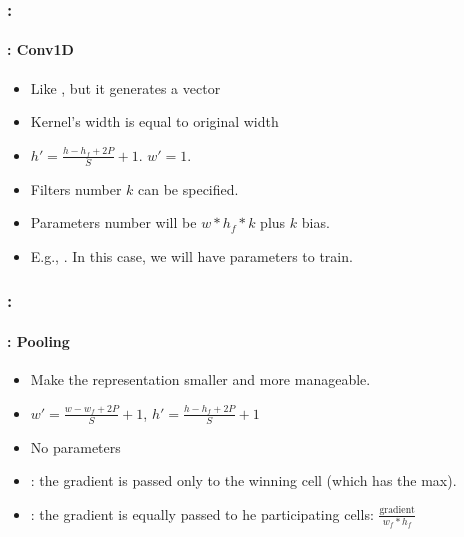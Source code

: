 \documentclass[xcolor=table]{beamer}
\begin{document}
\begin{frame}
	\frametitle{\insertshortsubtitle: \insertsection}
	\framesubtitle{\insertsubsection: Conv1D}
	
	\begin{minipage}{0.62\textwidth} 
		\begin{itemize}
			\item Like , but it generates a vector
			\item Kernel's width is equal to original width
			\item $ h' = \frac{h - h_f + 2P}{S} + 1$. $ w' = 1$.
			\item Filters number $k$ can be specified.
			\item Parameters number will be $w * h_f * k$ plus $k$ bias.
			\item E.g., . In this case, we will have  parameters to train.
		\end{itemize}
	\end{minipage}
	\begin{minipage}{0.37\textwidth}
	\end{minipage}
	
\end{frame}

\begin{frame}
	\frametitle{\insertshortsubtitle: \insertsection}
	\framesubtitle{\insertsubsection: Pooling}
	
	\begin{minipage}{0.60\textwidth} 
		\begin{itemize}
			\item Make the representation smaller and more manageable.
			\item $ w' = \frac{w - w_f + 2P}{S} + 1$,  $ h' = \frac{h - h_f + 2P}{S} + 1$
			\item No parameters 
			\item {}: the gradient is passed only to the winning cell (which has the max).
			\item {}: the gradient is equally passed to he participating cells: $\frac{\text{gradient}}{w_f * h_f}$ 
		\end{itemize}
	\end{minipage}
	\begin{minipage}{0.39\textwidth}
	\end{minipage}
	
\end{frame}
\end{document}

